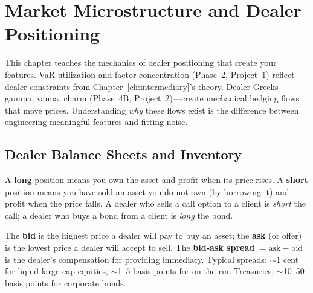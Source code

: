 
\chapter{Market Microstructure and Dealer Positioning}
\label{ch:microstructure}

\begin{projectconnection}
This chapter teaches the mechanics of dealer positioning that create
your features.  VaR utilization and factor concentration
(Phase~2, Project~1) reflect dealer constraints from
Chapter~\ref{ch:intermediary}'s theory.  Dealer Greeks---gamma, vanna,
charm (Phase~4B, Project~2)---create mechanical hedging flows that
move prices.  Understanding \emph{why} these flows exist is the
difference between engineering meaningful features and fitting noise.
\end{projectconnection}


\section{Dealer Balance Sheets and Inventory}
\label{sec:dealer-inventory}

\begin{prereq}
A \textbf{long} position means you own the asset and profit when its
price rises.  A \textbf{short} position means you have sold an asset
you do not own (by borrowing it) and profit when the price falls.
A dealer who sells a call option to a client is \emph{short} the call;
a dealer who buys a bond from a client is \emph{long} the bond.
\end{prereq}

\begin{prereq}
The \textbf{bid} is the highest price a dealer will pay to buy an
asset; the \textbf{ask} (or offer) is the lowest price a dealer will
accept to sell.  The \textbf{bid-ask spread} $= \text{ask} - \text{bid}$
is the dealer's compensation for providing immediacy.  Typical spreads:
$\sim$1 cent for liquid large-cap equities, $\sim$1--5 basis points
for on-the-run Treasuries, $\sim$10--50 basis points for corporate
bonds.
\end{prereq}

